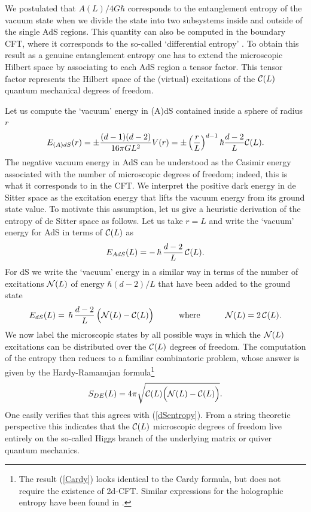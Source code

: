 \documentclass[a4paper,12pt]{article}
\newcommand{\be}{\begin{equation}}
\newcommand{\ee}{\end{equation}}
\begin{document}
We postulated that $A(L)/4G\hbar$ corresponds to the entanglement entropy of the vacuum 
state when we divide the state into two subsystems inside and outside of the single AdS regions. This 
quantity can also be computed in the boundary CFT, where it corresponds to 
the so-called `differential entropy' \cite{holeography}. To obtain this result as a 
genuine entanglement entropy one has to extend the microscopic Hilbert  space by 
associating to each AdS region a tensor factor. This tensor factor represents the Hilbert 
space of the (virtual) excitations of the  ${\cal C}(L)$ quantum mechanical degrees of 
freedom. 

Let us compute the `vacuum' energy in (A)dS contained inside a sphere of radius $r$
\be
E_{(A)dS}(r) = %
\pm {(d-1)(d-2) \over 16\pi GL^2} V(r) = \pm \left({r\over L}\right)^{d-1} \hbar {d-2\over L}  {\cal C}(L) . %
\ee
 The negative vacuum energy in AdS can be understood as the Casimir energy associated with the number of microscopic degrees of freedom; indeed, this is what it 
corresponds to in the CFT. We interpret the  positive dark energy in de Sitter space as the excitation energy that lifts the vacuum energy from its ground state value. To motivate this assumption, let us give a heuristic derivation of the entropy of de Sitter space as follows. Let us take $r=L$ and write the `vacuum' energy for AdS in terms of ${\cal C}(L)$ as\\[-2mm]
\be
\label{Casimir}
E_{AdS}%
(L) = -\, \hbar \,{d-2\over L}\, {\cal C}(L).
\ee
For dS we write the `vacuum' energy in a similar way in terms of the number of excitations ${\cal N}(L)$ of energy $\hbar (d-2)/L$ that have been added to the ground state  
 \be
\label{Estar}
E_{dS}(L) = \,\hbar\, {d-2\over L} \,\Bigl({\cal N}(L)-{\cal C}(L)\Bigr) \qquad \quad\mbox{where}\quad \qquad {\cal N}(L) = 2 \, {\cal C}(L). 
\ee
We now label the microscopic states by all possible ways in which the  ${\cal N}(L)$ 
 excitations can be distributed over the ${\cal C}(L)$ degrees of freedom. The computation 
 of the entropy then reduces to a familiar combinatoric problem, whose answer is given by 
 the Hardy-Ramanujan formula\footnote{ The result (\ref{Cardy}) looks identical to the Cardy formula, but does not require the existence of 2d-CFT. Similar expressions for the holographic entropy have been found in \cite{CV, PadmaVirasoro}.}\\[-3mm]
\be
\label{Cardy}
S_{DE}(L) =4\pi \sqrt {{\cal C}(L)\Bigr({\cal N}(L)-{\cal C}(L)\Bigr)}. %
\ee
One easily verifies that this agrees with (\ref{dSentropy}). From a string theoretic perspective this indicates that the ${\cal C}(L)$ microscopic degrees of freedom live entirely on the so-called Higgs branch of the underlying matrix or quiver quantum mechanics.
\end{document}
